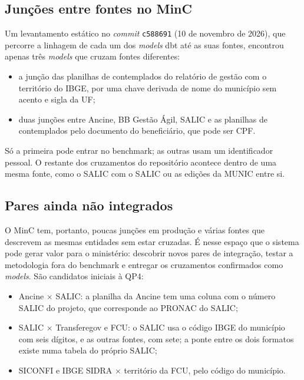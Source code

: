 \subsection{Junções entre fontes no MinC}

Um levantamento estático no \emph{commit} \texttt{c588691} (10 de novembro de
2026), que percorre a linhagem de cada um dos \emph{models} dbt até as suas
fontes, encontrou apenas três \emph{models} que cruzam fontes diferentes:

\begin{itemize}
\item a junção das planilhas de contemplados do relatório de gestão com o
território do IBGE, por uma chave derivada de nome do município sem acento e
sigla da UF;
\item duas junções entre Ancine, BB Gestão Ágil, SALIC e as planilhas de
contemplados pelo documento do beneficiário, que pode ser CPF.
\end{itemize}

Só a primeira pode entrar no benchmark; as outras usam um identificador
pessoal. O restante dos cruzamentos do repositório acontece dentro de uma
mesma fonte, como o SALIC com o SALIC ou as edições da MUNIC entre si.

\subsection{Pares ainda não integrados}

O MinC tem, portanto, poucas junções em produção e várias fontes que
descrevem as mesmas entidades sem estar cruzadas. É nesse espaço que o
sistema pode gerar valor para o ministério: descobrir novos pares de
integração, testar a metodologia fora do benchmark e entregar os cruzamentos
confirmados como \emph{models}. São candidatos iniciais à QP4:

\begin{itemize}
\item Ancine $\times$ SALIC: a planilha da Ancine tem uma coluna com o número
SALIC do projeto, que corresponde ao PRONAC do SALIC;
\item SALIC $\times$ Transferegov e FCU: o SALIC usa o código IBGE do
município com seis dígitos, e as outras fontes, com sete; a ponte entre os
dois formatos existe numa tabela do próprio SALIC;
\item SICONFI e IBGE SIDRA $\times$ território da FCU, pelo código do
município.
\end{itemize}

